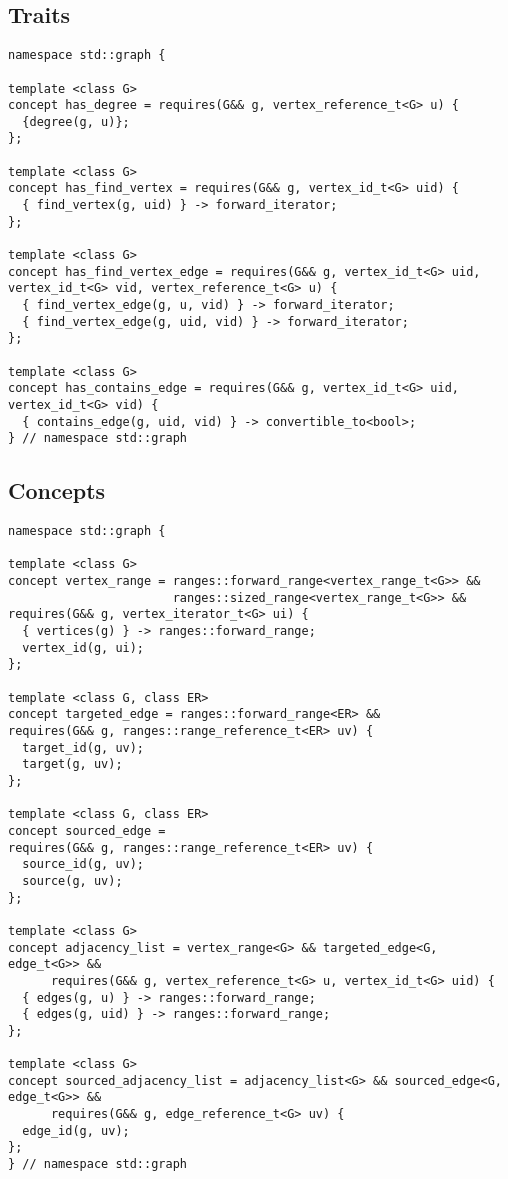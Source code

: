 \subsection{Traits}
\begin{lstlisting}
namespace std::graph {

template <class G>
concept has_degree = requires(G&& g, vertex_reference_t<G> u) {
  {degree(g, u)};
};

template <class G>
concept has_find_vertex = requires(G&& g, vertex_id_t<G> uid) {
  { find_vertex(g, uid) } -> forward_iterator;
};

template <class G>
concept has_find_vertex_edge = requires(G&& g, vertex_id_t<G> uid, vertex_id_t<G> vid, vertex_reference_t<G> u) {
  { find_vertex_edge(g, u, vid) } -> forward_iterator;
  { find_vertex_edge(g, uid, vid) } -> forward_iterator;
};

template <class G>
concept has_contains_edge = requires(G&& g, vertex_id_t<G> uid, vertex_id_t<G> vid) {
  { contains_edge(g, uid, vid) } -> convertible_to<bool>;
} // namespace std::graph
\end{lstlisting}

\subsection{Concepts}
\begin{lstlisting}
namespace std::graph {

template <class G>
concept vertex_range = ranges::forward_range<vertex_range_t<G>> && 
                       ranges::sized_range<vertex_range_t<G>> &&
requires(G&& g, vertex_iterator_t<G> ui) {
  { vertices(g) } -> ranges::forward_range;
  vertex_id(g, ui);
};

template <class G, class ER>
concept targeted_edge = ranges::forward_range<ER> && 
requires(G&& g, ranges::range_reference_t<ER> uv) {
  target_id(g, uv);
  target(g, uv);
};

template <class G, class ER>
concept sourced_edge = 
requires(G&& g, ranges::range_reference_t<ER> uv) {
  source_id(g, uv);
  source(g, uv);
};

template <class G>
concept adjacency_list = vertex_range<G> && targeted_edge<G, edge_t<G>> &&
      requires(G&& g, vertex_reference_t<G> u, vertex_id_t<G> uid) {
  { edges(g, u) } -> ranges::forward_range;
  { edges(g, uid) } -> ranges::forward_range;
};

template <class G>
concept sourced_adjacency_list = adjacency_list<G> && sourced_edge<G, edge_t<G>> &&
      requires(G&& g, edge_reference_t<G> uv) {
  edge_id(g, uv);
};
} // namespace std::graph
\end{lstlisting}

